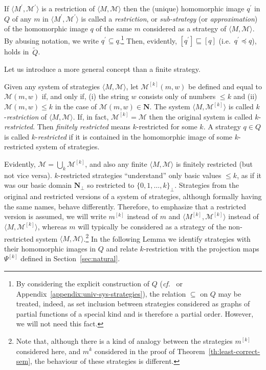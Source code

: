 \documentclass[fleqn]{LMCS}
\theoremstyle{plain}\newtheorem{satz}[thm]{Satz}
\theoremstyle{plain}\newtheorem{hyp}[thm]{Hypothesis}
\theoremstyle{plain}\newtheorem{hyps}[thm]{Hypotheses}
\theoremstyle{definition}\newtheorem{note}[thm]{Note}
\def\cf{{\em cf.}}
\newcommand{\setof}[1]{\{#1\}}
\newcommand{\pr}{^{\prime}}
\newcommand{\la}{\langle}
\newcommand{\ra}{\rangle}
\newcommand{\tuple}[1]{\la #1 \ra}
\newcommand{\NN}{\mathbf{N}}
\newcommand{\Undef}{{\perp}}
\newcommand{\MM}{{\mathcal M}}
\newcommand{\tQ}{\tilde{Q}}
\newcommand{\lee}{\preceq}
\newcommand{\sqle}{\sqsubseteq}
\newcommand{\?}{\mbox{?}}
\begin{document}
\noindent
If $\tuple{M\pr,\MM\pr}$ is a restriction of $\tuple{M,\MM}$ 
then the (unique)
homomorphic image $q\pr$ in $Q$ of any $m$ in
$\tuple{M\pr,\MM\pr}$ is called a 
\emph{restriction}, or \emph{sub-strategy} (or \emph{approximation}) 
of the homomorphic
image $q$ of the same $m$ considered as a strategy of $\tuple{M,\MM}$. 
By abusing notation, we write $q\pr\subseteq q$.\footnote{By considering the explicit construction of $Q$ 
(\cf\ \cite{Saz76t} or Appendix~\ref{appendix:univ-sys-strategies}), the relation $\subseteq$ on $Q$ may be treated, indeed, 
as set inclusion between strategies considered as graphs of partial functions 
of a special kind and is therefore 
a partial order. However, we will not need this fact. 
}
Then, evidently, $[q\pr]\sqle [q]$ (i.e.\ $q\pr\lee q$), holds in~$\tQ$.

Let us introduce a more general concept than a finite strategy. 

\begin{defi}\label{def:finitely-restricted}Given any system of strategies $\tuple{M,\MM}$, 
let $\MM^{[k]}(m,w)$ be defined and equal to $\MM(m,w)$ 
if, and only if, (i) the string $w$ consists only of numbers ${}\le k$ 
and (ii)~$\MM(m,w)\le k$ in the case of $\MM(m,w)\in\NN$. 
The system $\tuple{M,\MM^{[k]}}$ 
is called \mbox{$k$-\emph{restriction}} of $\tuple{M,\MM}$. 
If, in fact, $\MM^{[k]}=\MM$ then 
the original system is called \mbox{$k$-\emph{restricted}}. 
Then \emph{finitely restricted} means $k$-restricted for some $k$. 
A strategy $q\in Q$ is called $k$-\emph{restricted} if it is contained in the homomorphic 
image of some $k$-restricted system of strategies. 
\end{defi}
\noindent
Evidently, $\MM=\bigcup_k\MM^{[k]}$, and also 
any finite $\tuple{M,\MM}$ is finitely restricted (but not vice versa). 
$k$-restricted strategies ``understand'' only basic values ${}\le k$, 
as if it was our basic domain $\NN_\Undef$ so restricted to 
$\setof{0,1,\ldots,k}_\Undef$. 
Strategies from the original and restricted versions 
of a system of strategies, although formally having the same names, 
behave differently. Therefore, to emphasize that a restricted version 
is assumed, we will write $m^{[k]}$ instead of $m$ and 
$\tuple{M^{[k]},\MM^{[k]}}$ instead of $\tuple{M,\MM^{[k]}}$, 
whereas $m$ will typically be considered as a strategy of the 
non-restricted system $\tuple{M,\MM}$.\footnote{Note that, although there is a kind of analogy between the strategies $m^{[k]}$ 
considered here, and $m^k$ considered in the proof of 
Theorem~\ref{th:least-correct-sem}, the behaviour of these strategies is different. 
}
In the following Lemma 
we identify strategies with their homomorphic images in $Q$ 
and relate $k$-restriction with the projection maps $\Psi^{[k]}$ 
defined in Section~\ref{sec:natural}. 
\end{document}
